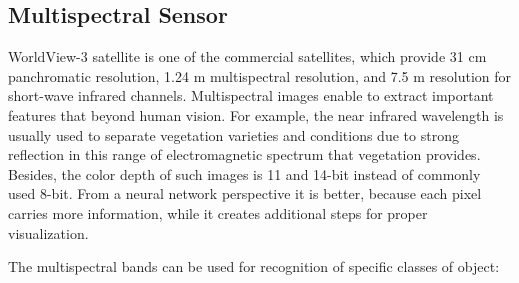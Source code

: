 \documentclass[10pt,twocolumn,letterpaper]{article}
\begin{document}
\subsection{Multispectral Sensor}
\label{section:sensor}

WorldView-3 satellite is one of the commercial satellites, which provide 31 cm panchromatic resolution, 1.24 m multispectral resolution, and 7.5 m resolution for short-wave infrared channels. Multispectral images enable to extract important features that beyond human vision. For example, the near infrared wavelength is usually used to separate vegetation varieties and conditions due to strong reflection in this range of electromagnetic spectrum that vegetation provides. Besides, the color depth of such images is 11 and 14-bit instead of commonly used 8-bit. From a neural network perspective it is better, because each pixel carries more information, while it creates additional steps for proper visualization.

The multispectral bands can be used for recognition of specific classes of object:
\end{document}
